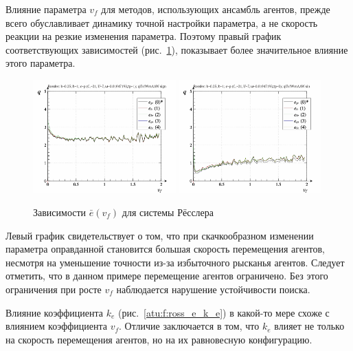 Влияние параметра $v_f$ для методов, использующих ансамбль агентов,
прежде всего обуславливает динамику точной настройки параметра,
а не скорость реакции на резкие изменения параметра.
Поэтому правый график соответствующих зависимостей
(рис.~\ref{atu:f:ross_e_v_f}), показывает
более значительное влияние этого параметра.


\begin{figure}[ht!]
\begin{center}
  \includegraphics[width=0.49\textwidth]{p/cha/ross/ross_id-p_v_f_ql3rlWvnAAW_sign.png}
  \hfill
  \includegraphics[width=0.49\textwidth]{p/cha/ross/ross_id-p_v_f_ql3rlWvnAAW_sin.png}
\end{center}
  \caption{Зависимости $\bar{e}(v_f)$ для системы Рёсслера}
\label{atu:f:ross_e_v_f}
\end{figure}


Левый график свидетельствует о том, что при скачкообразном изменении параметра
оправданной становится большая скорость перемещения агентов,
несмотря на уменьшение точности из-за избыточного рысканья агентов.
Следует отметить, что в данном примере перемещение агентов ограничено.
Без этого ограничения при росте $v_f$ наблюдается нарушение устойчивости поиска.

Влияние коэффициента $k_e$ (рис.~\ref{atu:f:ross_e_k_e})
в какой-то мере схоже с влиянием коэффициента $v_f$.
Отличие заключается в том, что $k_e$ влияет не только на скорость перемещения агентов,
но на их равновесную конфигурацию.

